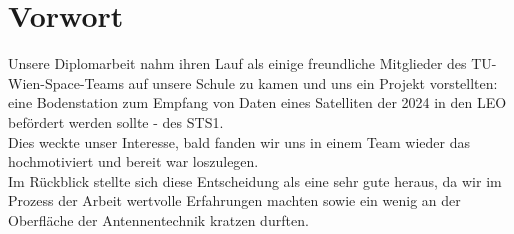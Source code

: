 \chapter*{Vorwort}
\label{chap:Vorwort}
Unsere Diplomarbeit nahm ihren Lauf als einige freundliche Mitglieder des TU-Wien-Space-Teams auf unsere Schule zu kamen und uns ein Projekt vorstellten: eine Bodenstation zum Empfang von Daten eines Satelliten der 2024 in den LEO befördert werden sollte - des STS1.\\
\newline
Dies weckte unser Interesse, bald fanden wir uns in einem Team wieder das hochmotiviert und bereit war loszulegen.\\
\newline
Im Rückblick stellte sich diese Entscheidung als eine sehr gute heraus, da wir im Prozess der Arbeit wertvolle Erfahrungen machten sowie ein wenig an der Oberfläche der Antennentechnik kratzen durften.
